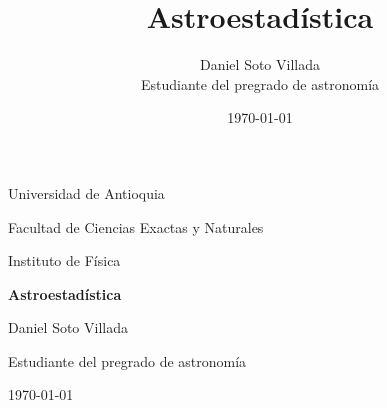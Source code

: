 \documentclass[12pt,letterpaper]{report}
\title{Astroestadística}
\author{Daniel Soto Villada\\Estudiante del pregrado de astronomía}
\date{\today}
\begin{document}
\begin{titlepage}
    \centering
    {\Large Universidad de Antioquia\par}
    \vspace{0.5cm}
    {\large Facultad de Ciencias Exactas y Naturales\par}
    \vspace{0.5cm}
    {\large Instituto de Física\par}
    \vfill
    {\Huge\bfseries Astroestadística\par}
    \vfill
    {\large Daniel Soto Villada\par}
    \vspace{0.3cm}
    {\large Estudiante del pregrado de astronomía\par}
    \vfill
    {\large \today\par}
\end{titlepage}

\tableofcontents
\newpage
















\end{document}

